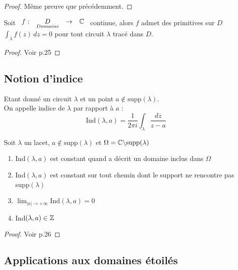\documentclass[]{report}
\begin{document}
\begin{proof}
    Même preuve que précédemment.
\end{proof}

\begin{prop}
    Soit $\begin{array}{ccccc}
f : & \underset{Domaine}{D} & \to & \mathbb{C}
\end{array}$ continue, alors $f$ admet des primitives sur $D$ \ssi $\displaystyle{\int_\lambda f(z)\,dz=0}$ pour tout circuit $\lambda$ tracé dans $D$.
\end{prop}

\begin{proof}
    Voir p.25
\end{proof}

\subsection{Notion d'indice}

\begin{df}
    Etant donné un circuit $\lambda$ et un point $a\notin \text{supp}(\lambda)$.\\
    On appelle indice de $\lambda$ par rapport à $a$ : $$\text{Ind}(\lambda,a)=\frac{1}{2\pi i}\int_\lambda\frac{dz}{z-a}$$
\end{df}

\begin{prop}
Soit $\lambda$ un lacet, $a\notin\text{supp}(\lambda)$ et $\Omega=\mathbb{C}\backslash\text{supp}(\lambda)$
    \begin{enumerate}
        \item Ind$(\lambda,a)$ est constant quand a décrit un domaine inclus dans $\Omega$
        \item $\text{Ind}(\lambda,a)$ est constant sur tout chemin dont le support ne rencontre pas supp$(\lambda)$
        \item $\displaystyle{\lim_{|a|\to+\infty}\text{Ind}(\lambda,a)=0}$
        \item Ind$(\lambda,a)\in\mathbb{Z}$
    \end{enumerate}
\end{prop}

\begin{proof}
    Voir p.26
\end{proof}

\subsection*{Applications aux domaines étoilés}
\end{document}
